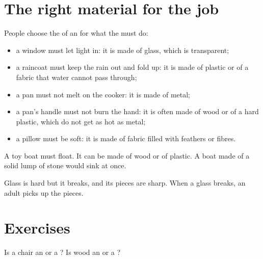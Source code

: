 \section{The right material for the job}

\begin{proposition}\label{prop:g1:materials-around-us:choose}
People choose the  of an  for what the  must do:
\begin{itemize}
  \item a window must let light in: it is made of glass, which is
        transparent;
  \item a raincoat must keep the rain out and fold up: it is made of
        plastic or of a fabric that water cannot pass through;
  \item a pan must not melt on the cooker: it is made of metal;
  \item a pan's handle must not burn the hand: it is often made of wood
        or of a hard plastic, which do not get as hot as metal;
  \item a pillow must be soft: it is made of fabric filled with feathers
        or fibres.
\end{itemize}
\end{proposition}

\begin{example}[A boat]\label{ex:g1:materials-around-us:boat}
A toy boat must float. It can be made of wood or of plastic. A boat made
of a solid lump of stone would sink at once.
\end{example}

\begin{remark}\label{rem:g1:materials-around-us:glass}
Glass is hard but it breaks, and its pieces are sharp. When a glass
breaks, an adult picks up the pieces.
\end{remark}

\section{Exercises}

\begin{exercise}[$\star$]\label{exo:g1:materials-around-us:1}
Is a chair an  or a ? Is wood an  or a ?
\end{exercise}

